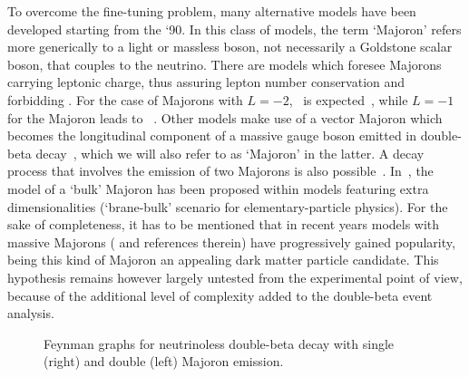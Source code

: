 \newpar
To overcome the fine-tuning problem, many alternative models have been
developed starting from the `90. In this class of models, the term `Majoron'
refers more generically to a light or massless boson, not necessarily a
Goldstone scalar boson, that couples to the neutrino. There are models which
foresee Majorons carrying leptonic charge, thus assuring lepton number
conservation and forbidding \onbb. For the case of Majorons with $L = −2$,
\onbbx\ is expected~\cite{Burgess1993}, while $L = −1$ for the Majoron leads to
\onbbxx~\cite{Burgess1994}. Other models make use of a vector Majoron which
becomes the longitudinal component of a massive gauge boson emitted in
double-beta decay~\cite{Carone1993}, which we will also refer to as `Majoron'
in the latter. A decay process that involves the emission of two Majorons is
also possible~\cite{Bamert1995}.  In~\cite{Mohpatra2000}, the model of a `bulk'
Majoron has been proposed within models featuring extra dimensionalities
(`brane-bulk' scenario for elementary-particle physics).
\newpar
For the sake of completeness, it has to be mentioned that in recent years
models with massive Majorons (\cite{Blum2018} and references therein) have
progressively gained popularity, being this kind of Majoron an appealing dark
matter particle candidate. This hypothesis remains however largely untested
from the experimental point of view, because of the additional level of
complexity added to the double-beta event analysis.

\begin{figure}
  \centering%
  \caption{%
    Feynman graphs for neutrinoless double-beta decay with single (right) and double
    (left) Majoron emission.
  }\label{fig:nbb:majfeydiag}
\end{figure}

